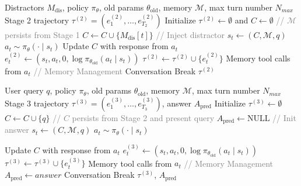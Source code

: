 \begin{algorithm}[p]
\caption{Stage 2: STM Control under Distractors}
\label{alg:stage2-rollout}
\begin{algorithmic}[1]
\Require Distractors $M_{\text{dis}}$, policy $\pi_{\theta}$, old params $\theta_{\text{old}}$, memory $\mathcal{M}$, max turn number $N_{max}$
\Ensure Stage 2 trajectory $\tau^{(2)} = (e_1^{(2)}, \ldots, e_{T_2}^{(2)})$
\State Initialize $\tau^{(2)} \gets \emptyset$ and $C \gets \emptyset$ \textcolor{gray}{// $\mathcal{M}$ persists from Stage 1}
    \State $C \gets C \cup \{M_{\text{dis}}[t]\}$ \textcolor{gray}{// Inject distractor}
    \State $s_t \gets (C, \mathcal{M}, q)$
    \State $a_t \sim \pi_{\theta}(\cdot \mid s_t)$
    \State Update $C$ with response from $a_t$
    \State $e_t^{(2)} \gets (s_t, a_t, 0, \log \pi_{\theta_{\text{old}}}(a_t \mid s_t))$
    \State $\tau^{(2)} \gets \tau^{(2)} \cup \{e_t^{(2)}\}$
    \State Memory tool calls from $a_t$ \textcolor{gray}{// Memory Management}
        \State Conversation Break
    \EndIf
\EndFor
\State \Return $\tau^{(2)}$
\end{algorithmic}
\end{algorithm}

\begin{algorithm}[p]
\caption{Stage 3: Integrated Reasoning and Memory Coordination}
\label{alg:stage3-rollout}
\begin{algorithmic}[1]
\Require User query $q$, policy $\pi_{\theta}$, old params $\theta_{\text{old}}$, memory $\mathcal{M}$, max turn number $N_{max}$
\Ensure Stage 3 trajectory $\tau^{(3)} = (e_1^{(3)}, \ldots, e_{T_3}^{(3)})$, answer $A_\text{pred}$
\State Initialize $\tau^{(3)} \gets \emptyset$
\State $C \gets C \cup \{q\}$ \textcolor{gray}{// $C$ persists from Stage 2 and present query}
\State $A_\text{pred} \gets \text{NULL}$ \textcolor{gray}{// Init answer}
    \State $s_t \gets (C, \mathcal{M}, q)$
    \State $a_t \sim \pi_{\theta}(\cdot \mid s_t)$

    \State Update $C$ with response from $a_t$
    \State $e_t^{(3)} \gets (s_t, a_t, 0, \log \pi_{\theta_{\text{old}}}(a_t \mid s_t))$
    \State $\tau^{(3)} \gets \tau^{(3)} \cup \{e_t^{(3)}\}$
        \State Memory tool calls from $a_t$ \textcolor{gray}{// Memory Management}
        \State $A_\text{pred} \gets answer$
        \State Conversation Break
    \EndIf
\EndFor
\State \Return $\tau^{(3)}$, $A_\text{pred}$
\end{algorithmic}
\end{algorithm}

